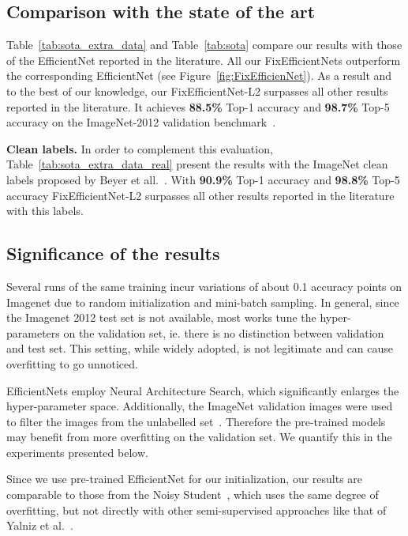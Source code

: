 \documentclass{article}
\begin{document}
\subsection{Comparison with the state of the art}

Table~\ref{tab:sota_extra_data} and Table~\ref{tab:sota} compare our results with those of the EfficientNet reported in the literature. 
All our FixEfficientNets outperform the corresponding EfficientNet (see Figure~\ref{fig:FixEfficienNet}). As a result and to the best of our knowledge, our FixEfficientNet-L2 surpasses all other results reported in the literature.
It achieves \textbf{88.5\%} Top-1 accuracy and \textbf{98.7\%} Top-5 accuracy on the ImageNet-2012 validation benchmark~\cite{Russakovsky2015ImageNet12}.

\bigskip \noindent
\textbf{Clean labels. \quad} 
In order to complement this evaluation, Table~\ref{tab:sota_extra_data_real}  present the results with the ImageNet clean labels proposed by Beyer et all.~\cite{Beyer2020AreWD}. 
With \textbf{90.9\%} Top-1 accuracy and \textbf{98.8\%} Top-5 accuracy FixEfficientNet-L2 surpasses all other results reported in the literature with this labels.


\subsection{Significance of the results}
\label{sec:significance}

Several runs of the same training incur variations of about 0.1 accuracy points on Imagenet due to random initialization and mini-batch sampling.
In general, since the Imagenet 2012 test set is not available, most works tune the hyper-parameters on the validation set, ie.  there is no distinction between validation and test set. This setting, while widely adopted, is not legitimate and can cause overfitting to go unnoticed.

EfficientNets employ Neural Architecture Search, which significantly enlarges the hyper-parameter space.   
Additionally, the ImageNet validation images were used to filter the images from the unlabelled set~\cite{Xie2019SelftrainingWN}. 
Therefore the pre-trained models may benefit from more overfitting on the validation set. 
We quantify this in the experiments presented below. 

Since we use pre-trained EfficientNet for our initialization, our results are comparable to those from the Noisy Student~\cite{Xie2019SelftrainingWN}, which uses the same degree of overfitting, but not directly with other semi-supervised approaches like that of Yalniz et al.~\cite{Yalniz2019BillionscaleSL}.
\end{document}
